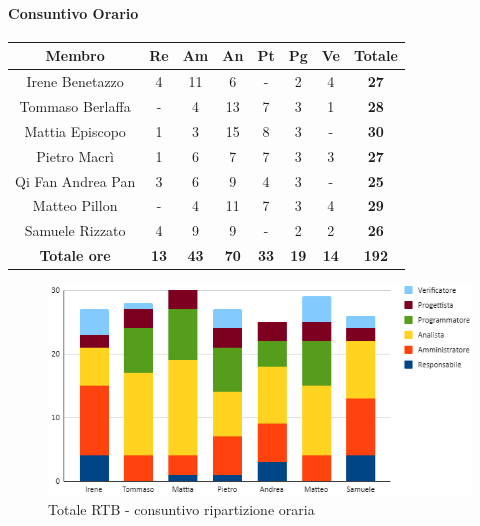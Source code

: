 \paragraph{Consuntivo Orario}
\begin{center}
	\renewcommand{\arraystretch}{1.8}
	\begin{tabular}{ |c|c|c|c|c|c|c|c| }
	\hline
	\textbf{Membro} & \textbf{Re} & \textbf{Am} &  \textbf{An} &  \textbf{Pt} &  \textbf{Pg} &  \textbf{Ve} &  \textbf{Totale}\\
    \hline
    Irene Benetazzo   & 4 & 11 & 6 & - & 2 & 4 & \textbf{27} \\
    \hline
    Tommaso Berlaffa  & - & 4 & 13 & 7 & 3 & 1 & \textbf{28} \\
    \hline
    Mattia Episcopo   & 1 & 3 & 15 & 8 & 3 & - & \textbf{30} \\
    \hline
    Pietro Macrì      & 1 & 6 & 7 & 7 & 3 & 3 & \textbf{27} \\
    \hline
    Qi Fan Andrea Pan & 3 & 6 & 9 & 4 & 3 & - & \textbf{25} \\
    \hline
    Matteo Pillon     & - & 4 & 11 & 7 & 3 & 4 & \textbf{29} \\
    \hline
    Samuele Rizzato   & 4 & 9 & 9 & - & 2 & 2 & \textbf{26} \\
    \hline
    \textbf{Totale ore} & \textbf{13} & \textbf{43} &  \textbf{70} &  \textbf{33} &  \textbf{19} &  \textbf{14} &  \textbf{192}\\
    \hline
	\end{tabular}
\end{center}
\begin{figure}[H]
    \centering\includegraphics[width=\textwidth, height=\textheight,keepaspectratio]{images/consuntivo/RTB-ore.png}
    \caption{Totale RTB - consuntivo ripartizione oraria}
\end{figure}

